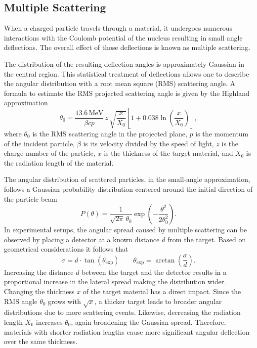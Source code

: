 \documentclass[sn-mathphys-num,iicol]{sn-jnl}
\theoremstyle{thmstyleone}
\theoremstyle{thmstyletwo}
\theoremstyle{thmstylethree}
\begin{document}
\subsection{Multiple Scattering}\label{subsec:theory_scattering}
When a charged particle travels through a material, it undergoes numerous interactions with the Coulomb potential of the nucleus resulting in small angle deflections.
The overall effect of those deflections is known as multiple scattering. 

The distribution of the resulting deflection angles is approximately Gaussian in the central region. 
This statistical treatment of deflections allows one to describe the angular distribution with a root mean square (RMS) scattering angle.
A formula to estimate the RMS projected scattering angle is given by the Highland approximation \cite{Highland}
\begin{equation}\label{eq:Highland}
    \theta_0 = \frac{13.6\,\text{MeV}}{\beta cp} \, z \, \sqrt{\frac{x}{X_0}} \left[1 + 0.038 \ln\left(\frac{x}{X_0}\right)\right],
\end{equation}
where $\theta_0$ is the RMS scattering angle in the projected plane, $p$ is the momentum of the incident particle, $\beta$ is its velocity divided by the speed of light, $z$ is the charge number of the particle, $x$ is the thickness of the target material, and $X_0$ is the radiation length of the material.

The angular distribution of scattered particles, in the small-angle approximation, follows a Gaussian probability distribution centered around the initial direction of the particle beam \cite{Highland2}
\begin{equation}\label{eq:Gauss}
P(\theta) = \frac{1}{\sqrt{2\pi} \, \theta_0} \exp\left( -\frac{\theta^2}{2\theta_0^2} \right).
\end{equation}
In experimental setups, the angular spread caused by multiple scattering can be observed by placing a detector at a known distance $d$ from the target. 
Based on geometrical considerations it follows that \cite{Highland2}
\begin{equation}\label{eq:theta_exp}
\sigma = d \cdot \tan\left(\theta_{\text{exp}}\right)\qquad
\theta_{\text{exp}} = \arctan\left( \frac{\sigma}{d} \right).
\end{equation}
Increasing the distance $d$ between the target and the detector results in a proportional increase in the lateral spread making the distribution wider.
Changing the thickness $x$ of the target material has a direct impact. 
Since the RMS angle $\theta_0$ grows with $\sqrt{x}$, a thicker target leads to broader angular distributions due to more scattering events. 
Likewise, decreasing the radiation length $X_0$ increases $\theta_0$, again broadening the Gaussian spread. 
Therefore, materials with shorter radiation lengths cause more significant angular deflection over the same thickness.
\end{document}
